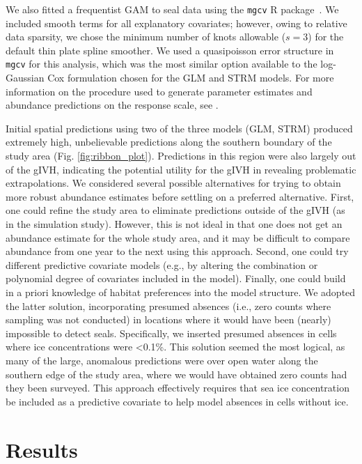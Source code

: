 \documentclass[10pt,letterpaper]{article}
\begin{document}
We also fitted a frequentist GAM to seal data using the \texttt{mgcv} R package~\cite{Wood2006}. We included smooth terms for all explanatory covariates; however, owing to relative data sparsity, we chose the minimum number of knots allowable ($s=3$) for the default thin plate spline smoother.  We used a quasipoisson error structure in \texttt{mgcv} for this analysis, which was the most similar option available to the log-Gaussian Cox formulation chosen for the GLM and STRM models.  For more information on the procedure used to generate parameter estimates and abundance predictions on the response scale, see .

Initial spatial predictions using two of the three models (GLM, STRM) produced extremely high, unbelievable predictions along the southern boundary of the study area (Fig. \ref{fig:ribbon_plot}).  Predictions in this region were also largely out of the gIVH, indicating the potential utility for the gIVH in revealing problematic extrapolations.
We considered several possible alternatives for trying to obtain more robust abundance estimates before settling on a preferred alternative.  First, one could refine the study area to eliminate predictions outside of the gIVH (as in the simulation study).  However, this is not ideal in that one does not get an abundance estimate for the whole study area, and it may be difficult to compare abundance from one year to the next using this approach. Second, one could try different predictive covariate models (e.g., by altering the combination or polynomial degree of covariates included in the model).  Finally, one could build in a priori knowledge of habitat preferences into the model structure.  We adopted the latter solution, incorporating presumed absences (i.e., zero counts where sampling was not conducted) in locations where it would have been (nearly) impossible to detect seals.  Specifically, we inserted presumed absences in cells where ice concentrations were \textless 0.1\%.  This solution seemed the most logical, as many of the large, anomalous predictions were over open water along the southern edge of the study area, where we would have obtained zero counts had they been surveyed.  This approach effectively requires that sea ice concentration be included as a predictive covariate to help model absences in cells without ice.


\section*{Results}
\end{document}
